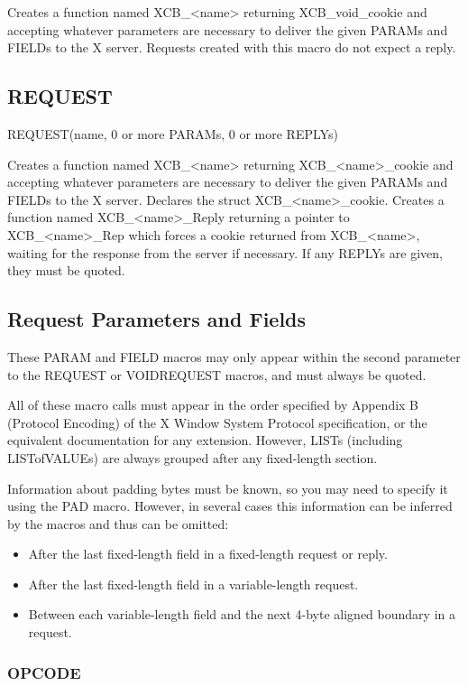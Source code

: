 \documentclass[english]{article}
\begin{document}
Creates a function named XCB\_<name> returning XCB\_void\_cookie and
accepting whatever parameters are necessary to deliver the given PARAMs
and FIELDs to the X server. Requests created with this macro do not
expect a reply.


\subsection{REQUEST}

REQUEST(name, 0 or more PARAMs, 0 or more REPLYs)

Creates a function named XCB\_<name> returning XCB\_<name>\_cookie
and accepting whatever parameters are necessary to deliver the given
PARAMs and FIELDs to the X server. Declares the struct XCB\_<name>\_cookie.
Creates a function named XCB\_<name>\_Reply returning a pointer to
XCB\_<name>\_Rep which forces a cookie returned from XCB\_<name>,
waiting for the response from the server if necessary. If any REPLYs
are given, they must be quoted.


\subsection{Request Parameters and Fields}

These PARAM and FIELD macros may only appear within the second
parameter to the REQUEST or VOIDREQUEST macros, and must always
be quoted.

All of these macro calls must appear in the order specified
by Appendix B (Protocol Encoding) of the X Window System Protocol
specification, or the equivalent documentation for any extension.
However, LISTs (including LISTofVALUEs) are always grouped after
any fixed-length section.

Information about padding bytes must be known, so you may need to
specify it using the PAD macro. However, in several cases this
information can be inferred by the macros and thus can be omitted:
  \begin{itemize}
  \item After the last fixed-length field in a fixed-length request or reply.
  \item After the last fixed-length field in a variable-length request.
  \item Between each variable-length field and the next 4-byte aligned boundary in a request.
  \end{itemize}


\subsubsection{OPCODE}
\end{document}
